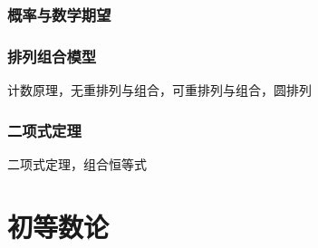 \documentclass[lang=cn, zihao=4.5]{elegantbook}
\begin{document}
\section{概率与数学期望}

\section{排列组合模型}

计数原理，无重排列与组合，可重排列与组合，圆排列

\section{二项式定理}

二项式定理，组合恒等式

\part{初等数论}
\end{document}
